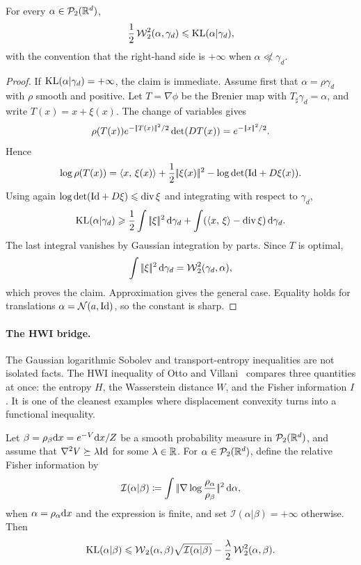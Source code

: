 \begin{prop}\label{prop-gaussian-talagrand-t2}
	For every $\alpha\in\mathcal{P}_2(\mathbb{R}^d)$,
	\[
		\frac12\operatorname{\mathcal{W}}_2^2(\alpha,\gamma_d)
		\leqslant
		\operatorname{KL}(\alpha|\gamma_d),
	\]
	with the convention that the right-hand side is \(+\infty\) when \(\alpha\not\ll\gamma_d\).
\end{prop}

\begin{proof}
	If \(\operatorname{KL}(\alpha|\gamma_d)=+\infty\), the claim is immediate. Assume first that \(\alpha=\rho\gamma_d\) with \(\rho\) smooth and positive. Let $T=\nabla\phi$ be the Brenier map with $T_\sharp\gamma_d=\alpha$, and write $T(x)=x+\xi(x)$. The change of variables gives
	\[
		\rho(T(x))e^{-|\!| T(x) |\!|^2/2}\det(DT(x))
		=
		e^{-|\!| x |\!|^2/2}.
	\]
	Hence
	\[
		\log \rho(T(x))
		=
		\langle x,\,\xi(x)\rangle
		+
		\frac12|\!| \xi(x) |\!|^2
		-
		\log\det(\mathrm{Id}+D\xi(x)).
	\]
	Using again $\log\det(\mathrm{Id}+D\xi)\leqslant\operatorname{div}\xi$ and integrating with respect to $\gamma_d$,
	\[
		\operatorname{KL}(\alpha|\gamma_d)
		\geqslant
		\frac12\int|\!| \xi |\!|^2\,\mathrm{d}\gamma_d
		+
		\int(\langle x,\,\xi\rangle-\operatorname{div}\xi)\,\mathrm{d}\gamma_d.
	\]
	The last integral vanishes by Gaussian integration by parts. Since $T$ is optimal,
	\[
		\int|\!| \xi |\!|^2\,\mathrm{d}\gamma_d=\operatorname{\mathcal{W}}_2^2(\gamma_d,\alpha),
	\]
	which proves the claim. Approximation gives the general case. Equality holds for translations \(\alpha=\mathcal{N}(a,\mathrm{Id})\), so the constant is sharp.
\end{proof}

\paragraph{The HWI bridge.}
The Gaussian logarithmic Sobolev and transport-entropy inequalities are not isolated facts. The HWI inequality of Otto and Villani~\cite{OttoVillani2000Generalization} compares three quantities at once: the entropy \(H\), the Wasserstein distance \(W\), and the Fisher information \(I\). It is one of the cleanest examples where displacement convexity turns into a functional inequality.

\begin{prop}\label{prop-hwi-inequality}
	Let $\beta=\rho_\beta\mathrm{d} x=e^{-V}\mathrm{d} x/Z$ be a smooth probability measure in $\mathcal{P}_2(\mathbb{R}^d)$, and assume that $\nabla^2 V\succeq \lambda \mathrm{Id}$ for some $\lambda\in\mathbb{R}$. For $\alpha\in\mathcal{P}_2(\mathbb{R}^d)$, define the relative Fisher information by
	\[
		\mathcal I(\alpha|\beta)
		\coloneqq
		\int |\!| \nabla\log\frac{\rho_\alpha}{\rho_\beta} |\!|^2\,\mathrm{d}\alpha,
	\]
	when \(\alpha=\rho_\alpha\mathrm{d} x\) and the expression is finite, and set \(\mathcal I(\alpha|\beta)=+\infty\) otherwise. Then
	\[
		\operatorname{KL}(\alpha|\beta)
		\leqslant
		\operatorname{\mathcal{W}}_2(\alpha,\beta)\sqrt{\mathcal I(\alpha|\beta)}
		-\frac{\lambda}{2}\operatorname{\mathcal{W}}_2^2(\alpha,\beta).
	\]
\end{prop}

